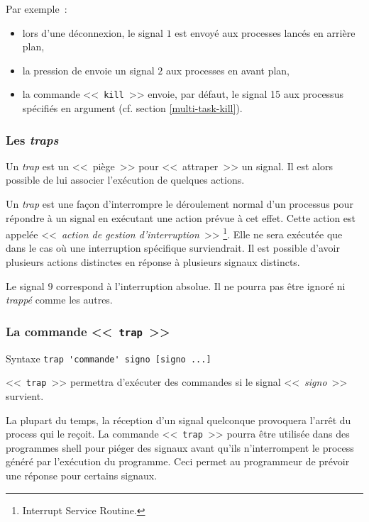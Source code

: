 Par exemple~:
\begin{itemize}
	\item	lors d'une d{\'e}connexion, le signal $1$ est envoy{\'e} aux processes lanc{\'e}s en
			arri{\`e}re plan,
	\item	la pression de  envoie un signal $2$ aux
			processes en avant plan,
	\item	la commande <<~\texttt{kill}~>> envoie, par d{\'e}faut, le signal 15 aux processus
			sp{\'e}cifi{\'e}s en argument (cf. section \ref{multi-task-kill}).
\end{itemize}

\subsubsection{Les \textsl{traps}}

Un \textsl{trap} est un <<~pi{\`e}ge~>> pour <<~attraper~>> un signal. Il est alors possible de lui
associer l'ex{\'e}cution de quelques actions.

Un \textsl{trap} est une fa\c{c}on d'interrompre le d{\'e}roulement normal d'un
processus pour r{\'e}pondre {\`a} un signal en ex{\'e}cutant une action pr{\'e}vue {\`a} cet
effet. Cette action est appel{\'e}e <<~\textsl{action de gestion d'interruption}~>>
\footnote{Interrupt Service Routine.}. Elle ne sera ex{\'e}cut{\'e}e que dans le cas o{\`u}
une interruption sp{\'e}cifique surviendrait. Il est possible d'avoir
plusieurs actions distinctes en r{\'e}ponse {\`a} plusieurs signaux distincts.

Le signal $9$ correspond {\`a} l'interruption absolue. Il ne pourra pas {\^e}tre ignor{\'e} ni
\textsl{trapp{\'e}} comme les autres.

\subsubsection{La commande <<~\texttt{trap}~>>}

\begin{definition}{Syntaxe}
\verb*=trap 'commande' signo [signo ...]=
\end{definition}

<<~\texttt{trap}~>> permettra d'ex{\'e}cuter des commandes si le signal
<<~\textsl{signo}~>> survient.

La plupart du temps, la r{\'e}ception d'un signal quelconque provoquera
l'arr{\^e}t du process qui le re\c{c}oit. La commande <<~\texttt{trap}~>> pourra
{\^e}tre utilis{\'e}e dans des programmes shell pour pi{\'e}ger des signaux avant
qu'ils n'interrompent le process g{\'e}n{\'e}r{\'e} par l'ex{\'e}cution du programme.
Ceci permet au programmeur de pr{\'e}voir une r{\'e}ponse pour certains signaux.

